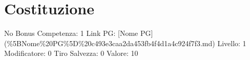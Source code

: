\section{Costituzione}\label{costituzione}

\begin{description}
\tightlist
\item[Tags: STAT]
No Bonus Competenza: 1 Link PG: {[}Nome PG{]}
(\%5BNome\%20PG\%5D\%20c493e3caa2da453fb4f4d1a4c924f7f3.md) Livello: 1
Modificatore: 0 Tiro Salvezza: 0 Valore: 10
\end{description}
